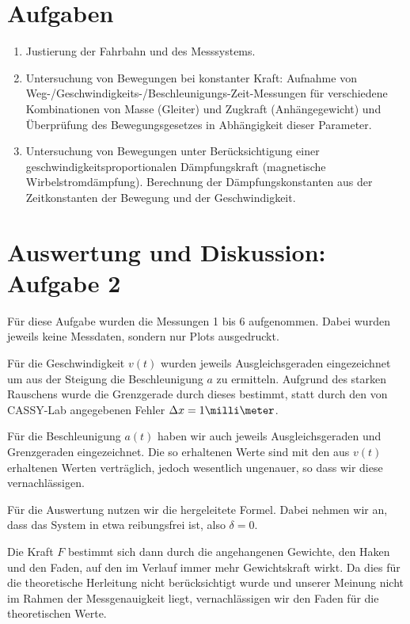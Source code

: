 \documentclass[a4paper,german,12pt,smallheadings]{scrartcl}
\begin{document}
\section*{Aufgaben}
\begin{enumerate}[1.]
  \item
    Justierung der Fahrbahn und des Messsystems.
  \item
    Untersuchung von Bewegungen bei konstanter Kraft: Aufnahme von
    Weg-/Geschwindigkeits-/Beschleunigungs-Zeit-Messungen für verschiedene
    Kombinationen von Masse (Gleiter) und Zugkraft (Anhängegewicht) und
    Überprüfung des Bewegungsgesetzes in Abhängigkeit dieser Parameter.
  \item
    Untersuchung von Bewegungen unter Berücksichtigung einer
    geschwindigkeitsproportionalen Dämpfungskraft (magnetische
    Wirbelstromdämpfung). Berechnung der Dämpfungskonstanten aus der
    Zeitkonstanten der Bewegung und der Geschwindigkeit.
\end{enumerate}

\newpage

\section*{Auswertung und Diskussion: Aufgabe 2}
Für diese Aufgabe wurden die Messungen 1 bis 6 aufgenommen. Dabei wurden
jeweils keine Messdaten, sondern nur Plots ausgedruckt.

Für die Geschwindigkeit $v(t)$ wurden jeweils Ausgleichsgeraden eingezeichnet
um aus der Steigung die Beschleunigung $a$ zu ermitteln. Aufgrund des starken
Rauschens wurde die Grenzgerade durch dieses bestimmt, statt durch den von
CASSY-Lab angegebenen Fehler $\Delta x = 1 \milli\meter$.

Für die Beschleunigung $a(t)$ haben wir auch jeweils Ausgleichsgeraden und
Grenzgeraden eingezeichnet. Die so erhaltenen Werte sind mit den aus $v(t)$
erhaltenen Werten verträglich, jedoch wesentlich ungenauer, so dass wir diese
vernachlässigen.

Für die Auswertung nutzen wir die hergeleitete Formel. Dabei nehmen wir an,
dass das System in etwa reibungsfrei ist, also $\delta = 0$.

Die Kraft $F$ bestimmt sich dann durch die angehangenen Gewichte, den Haken und
den Faden, auf den im Verlauf immer mehr Gewichtskraft wirkt. Da dies für die
theoretische Herleitung nicht berücksichtigt wurde und unserer Meinung nicht im
Rahmen der Messgenauigkeit liegt, vernachlässigen wir den Faden für die
theoretischen Werte.
\end{document}
